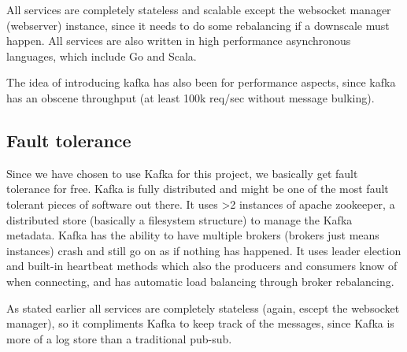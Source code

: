All services are completely stateless and scalable except the websocket manager (webserver) instance, since it needs to do some rebalancing if a downscale must happen.
All services are also written in high performance asynchronous languages, which include Go and Scala.

The idea of introducing kafka has also been for performance aspects, since kafka has an obscene throughput (at least 100k req/sec without message bulking).
\subsection{Fault tolerance}
Since we have chosen to use Kafka for this project, we basically get fault tolerance for free.
Kafka is fully distributed and might be one of the most fault tolerant pieces of software out there.
It uses >2 instances of apache zookeeper, a distributed store (basically a filesystem structure) to manage the Kafka metadata.
Kafka has the ability to have multiple brokers (brokers just means instances) crash and still go on as if nothing has happened.
It uses leader election and built-in heartbeat methods which also the producers and consumers know of when connecting, and has automatic load balancing through broker rebalancing.

As stated earlier all services are completely stateless (again, escept the websocket manager), so it compliments Kafka to keep track of the messages, since Kafka is more of a log store than a traditional pub-sub.
